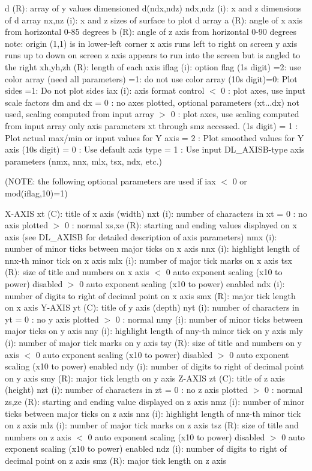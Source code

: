 d (R)\+: array of y values dimensioned d(ndx,ndz) ndx,ndz (i)\+: x and z dimensions of d array nx,nz (i)\+: x and z sizes of surface to plot d array a (R)\+: angle of x axis from horizontal 0-\/85 degrees b (R)\+: angle of z axis from horizontal 0-\/90 degrees note\+: origin (1,1) is in lower-\/left corner x axis runs left to right on screen y axis runs up to down on screen z axis appears to run into the screen but is angled to the right xh,yh,zh (R)\+: length of each axis iflag (i)\+: option flag (1\textquotesingle{}s digit) =2\+: use color array (need all parameters) =1\+: do not use color array (10\textquotesingle{}s digit)=0\+: Plot sides =1\+: Do not plot sides iax (i)\+: axis format control $<$ 0 \+: plot axes, use input scale factors dm and dx = 0 \+: no axes plotted, optional parameters (xt...dx) not used, scaling computed from input array $>$ 0 \+: plot axes, use scaling computed from input array only axis parameters xt through smz accessed. (1\textquotesingle{}s digit) = 1 \+: Plot actual max/min or input values for Y axis = 2 \+: Plot smoothed values for Y axis (10\textquotesingle{}s digit) = 0 \+: Use default axis type = 1 \+: Use input D\+L\+\_\+\+A\+X\+I\+S\+B-\/type axis parameters (nmx, nnx, mlx, tsx, ndx, etc.)

(N\+O\+TE\+: the following optional parameters are used if iax $<$ 0 or mod(iflag,10)=1)

X-\/\+A\+X\+IS xt (C)\+: title of x axis (width) nxt (i)\+: number of characters in xt = 0 \+: no axis plotted $>$ 0 \+: normal xs,xe (R)\+: starting and ending values displayed on x axis (see D\+L\+\_\+\+A\+X\+I\+SB for detailed description of axis parameters) nmx (i)\+: number of minor ticks between major ticks on x axis nnx (i)\+: highlight length of nnx-\/th minor tick on x axis mlx (i)\+: number of major tick marks on x axis tsx (R)\+: size of title and numbers on x axis $<$ 0 auto exponent scaling (x10 to power) disabled $>$ 0 auto exponent scaling (x10 to power) enabled ndx (i)\+: number of digits to right of decimal point on x axis smx (R)\+: major tick length on x axis Y-\/\+A\+X\+IS yt (C)\+: title of y axis (depth) nyt (i)\+: number of characters in yt = 0 \+: no y axis plotted $>$ 0 \+: normal nmy (i)\+: number of minor ticks between major ticks on y axis nny (i)\+: highlight length of nny-\/th minor tick on y axis mly (i)\+: number of major tick marks on y axis tsy (R)\+: size of title and numbers on y axis $<$ 0 auto exponent scaling (x10 to power) disabled $>$ 0 auto exponent scaling (x10 to power) enabled ndy (i)\+: number of digits to right of decimal point on y axis smy (R)\+: major tick length on y axis Z-\/\+A\+X\+IS zt (C)\+: title of z axis (height) nzt (i)\+: number of characters in zt = 0 \+: no z axis plotted $>$ 0 \+: normal zs,ze (R)\+: starting and ending value displayed on z axis nmz (i)\+: number of minor ticks between major ticks on z axis nnz (i)\+: highlight length of nnz-\/th minor tick on z axis mlz (i)\+: number of major tick marks on z axis tsz (R)\+: size of title and numbers on z axis $<$ 0 auto exponent scaling (x10 to power) disabled $>$ 0 auto exponent scaling (x10 to power) enabled ndz (i)\+: number of digits to right of decimal point on z axis smz (R)\+: major tick length on z axis

